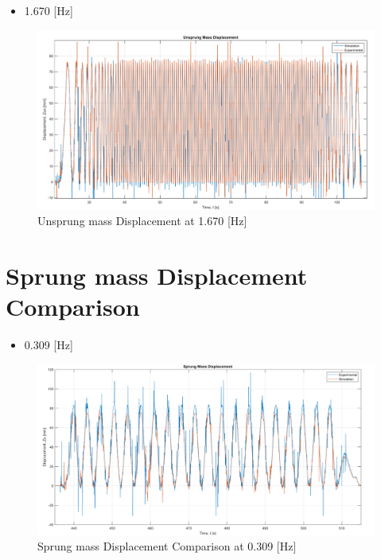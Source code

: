 \begin{itemize}
	\item 1.670 [Hz]
\end{itemize}
\begin{figure}[H]
	\centering
	\includegraphics[width=0.99\linewidth]{figures/1.67 Us.png}
	\caption{Unsprung mass Displacement at 1.670 [Hz]}
	\label{fig:Unsprung mass Displacement Comparison at 1.670}
\end{figure}

\section{Sprung mass Displacement Comparison}
\begin{itemize}
	\item 0.309 [Hz]
\end{itemize}
\begin{figure}[H]
	\centering
	\includegraphics[width=0.9\linewidth]{figures/0.309 S.png}
	\caption{Sprung mass Displacement Comparison at 0.309 [Hz]}
	\label{fig:Sprung mass Displacement Comparison at 0.309}
\end{figure}

